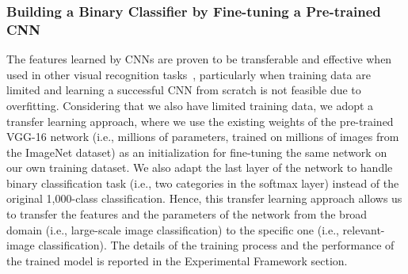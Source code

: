 \documentclass{iscram}
\begin{document}
\subsubsection{Building a Binary Classifier by Fine-tuning a Pre-trained CNN}
The features learned by CNNs are proven to be transferable and effective when used in other visual recognition tasks~\parencite{yosinski2014transferable,ozbulak2016transferable}, particularly when training data are limited and learning a successful CNN from scratch is not feasible due to overfitting. Considering that we also have limited training data, we adopt a transfer learning approach, where we use the existing weights of the pre-trained VGG-16 network (i.e., millions of parameters, trained on millions of images from the ImageNet dataset) as an initialization for fine-tuning the same network on our own training dataset. We also adapt the last layer of the network to handle binary classification task (i.e., two categories in the softmax layer) instead of the original 1,000-class classification. Hence, this transfer learning approach allows us to transfer the features and the parameters of the network from the broad domain (i.e., large-scale image classification) to the specific one (i.e., relevant-image classification). The details of the training process and the performance of the trained model is reported in the Experimental Framework section.
\end{document}
